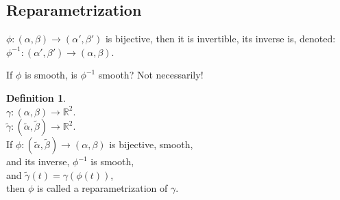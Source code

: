 \documentclass[twocolumn,20pt,fleqn]{extarticle}
\theoremstyle{plain}
\theoremstyle{definition}
\newtheorem*{definition}{Definition}
\theoremstyle{remark}
\begin{document}
\clearpage


\subsection{Reparametrization}
$\phi: (\alpha,\beta) \to (\alpha',\beta')$ is bijective, then it is invertible, its inverse is,
denoted: $\phi^{-1} : (\alpha',\beta') \to (\alpha,\beta)$.

If $\phi$ is smooth, is $\phi^{-1}$ smooth? Not necessarily!



\begin{definition}~\\
  $\gamma : (\alpha, \beta) \to \mathbb{R}^2$.\\
  $\tilde{\gamma} : (\tilde{\alpha}, \tilde{\beta}) \to \mathbb{R}^2$.\\
  If $\phi : (\tilde{\alpha}, \tilde{\beta})\to (\alpha, \beta)$ is bijective, smooth, \\and its inverse, $\phi^{-1}$ is smooth,\\ and
 $\tilde{\gamma}(t) = \gamma(\phi(t))$,\\ then $\phi$ is called a reparametrization of $\gamma$.
\end{definition}



\newpage
\end{document}
